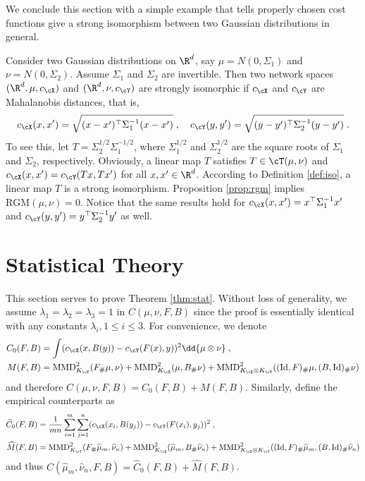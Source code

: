 \documentclass[11pt]{article}
\begin{document}
We conclude this section with a simple example that tells properly chosen cost functions give a strong isomorphism between two Gaussian distributions in general.

\begin{example}\label{ex:gauss}
	Consider two Gaussian distributions on $\R^d$, say $\mu = N(0, \Sigma_1)$ and $\nu = N(0, \Sigma_2)$. Assume $\Sigma_1$ and $\Sigma_2$ are invertible. Then two network spaces $(\R^d, \mu, c_{\cX})$ and $(\R^d, \nu, c_{\cY})$ are strongly isomorphic if $c_{\cX}$ and $c_{\cY}$ are Mahalanobis distances, that is, 
	\begin{equation*}
		c_{\cX}(x, x') = \sqrt{(x - x')^\top \Sigma_1^{- 1} (x - x')} \;, \quad c_{\cY}(y, y') = \sqrt{(y - y')^\top \Sigma_2^{- 1} (y - y')} \;.
	\end{equation*}
	To see this, let $T = \Sigma_2^{1 / 2} \Sigma_1^{- 1 / 2}$, where $\Sigma_1^{1 / 2}$ and $\Sigma_2^{1 / 2}$ are the square roots of $\Sigma_1$ and $\Sigma_2$, respectively. Obviously, a linear map $T$ satisfies $T \in \cT(\mu, \nu)$ and $c_{\cX}(x, x') = c_{\cY}(T x, T x')$ for all $x, x' \in \R^d$. According to Definition \ref{def:iso}, a linear map $T$ is a strong isomorphism. Proposition \ref{prop:rgm} implies $\mathrm{RGM}(\mu, \nu) = 0$. Notice that the same results hold for $c_{\cX}(x, x') = x^\top \Sigma_1^{-1} x'$ and $c_{\cY}(y, y') = y^\top \Sigma_2^{-1} y'$ as well.
\end{example}
	



\section{Statistical Theory}
\label{sec:statistical-theory}
This section serves to prove Theorem \ref{thm:stat}. Without loss of generality, we assume $\lambda_1 = \lambda_2 = \lambda_3 = 1$ in $C(\mu, \nu, F, B)$ since the proof is essentially identical with any constants $\lambda_i, 1\leq i \leq 3$. For convenience, we denote
\begin{align*}
	C_0(F, B) & = \int (c_{\cX}(x, B(y)) - c_{\cY}(F(x), y))^2 \dd{\mu \otimes \nu} \;, \\
	M(F, B) & = \mathrm{MMD}_{K_{\cY}}^2(F_{\#}\mu, \nu) + \mathrm{MMD}_{K_{\cX}}^2(\mu, B_{\#} \nu) + \mathrm{MMD}^2_{K_{\cX} \otimes K_{\cY}} ((\mathrm{Id}, F)_{\#}\mu, (B, \mathrm{Id})_{\#} \nu)
\end{align*}
and therefore $C(\mu, \nu, F, B) = C_0(F, B) + M(F, B)$. Similarly, define the empirical counterparts as
\begin{align*}
	\widehat{C}_0(F, B) & = \frac{1}{m n} \sum_{i = 1}^{m} \sum_{j = 1}^{n} (c_{\cX}(x_i, B(y_j)) - c_{\cY}(F(x_i), y_j))^2 \;, \\
	\widehat{M}(F, B) & = \mathrm{MMD}_{K_{\cY}}^2(F_{\#}\widehat{\mu}_m, \widehat{\nu}_n) + \mathrm{MMD}_{K_{\cX}}^2(\widehat{\mu}_m, B_{\#} \widehat{\nu}_n) + \mathrm{MMD}^2_{K_{\cX} \otimes K_{\cY}} ((\mathrm{Id}, F)_{\#} \widehat{\mu}_m, (B, \mathrm{Id})_{\#} \widehat{\nu}_n)
\end{align*}
and thus $C(\widehat{\mu}_m, \widehat{\nu}_n, F, B) = \widehat{C}_0(F, B) + \widehat{M}(F, B)$.
\end{document}

